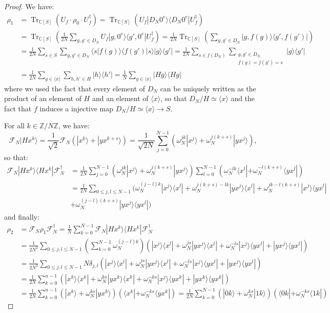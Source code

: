\documentclass[a4paper,10pt,notitlepage]{report}
\theoremstyle{definition}
\theoremstyle{plain}
\theoremstyle{definition}
\newcommand{\Z}{\mathbb{Z}}
\newcommand{\C}{\mathbb{C}}
\newcommand{\m}[1]{\mathcal{#1}}
\renewcommand{\(}{\left(}
\renewcommand{\)}{\right)}
\DeclareMathOperator{\Tr}{Tr}
\begin{document}
\begin{proof}
We have:
\begin{align*}
\rho_1&=\Tr_{\C[S]}(U_f\cdot \rho_0\cdot U_f^{\dag})=\Tr_{\C[S]}(U_f|D_N0^e\rangle\langle D_N 0^e|U_f^{\dag})\\
&=\Tr_{\C[S]}\(\frac{1}{2N}\sum_{g,g'\in D_N}U_f|g,0^e\rangle\langle g',0^e|U_f^{\dag}\)=\frac{1}{2N}\Tr_{\C[S]}\(\sum_{g,g'\in D_N}|g,f(g)\rangle\langle g',f(g')|\)\\
&=\frac{1}{2N}\sum_{s\in S}\sum_{g,g'\in D_N}\langle s|f(g)\rangle \langle f(g')|s\rangle |g\rangle\langle g'|=\frac{1}{2N}\sum_{s\in f(D_N)}\sum_{\substack{g,g'\in D_N\\f(g)=f(g')=s}}|g\rangle\langle g'|\\
&=\frac{1}{2N}\sum_{g\in \langle x\rangle}\sum_{h,h'\in H}|h\rangle\langle h'|=\frac{1}{N}\sum_{g\in \langle x\rangle}|Hg\rangle\langle Hg|
\end{align*}
where we used the fact that every element of $D_N$ can be uniquely written as the product of an element of $H$ and an element of $\langle x\rangle$, so that $D_N/H\simeq \langle x\rangle$ and the fact that $f$ induces a injective map $D_N/H\simeq \langle x\rangle\longrightarrow S$.

For all $k\in\Z/N\Z$, we have:
\[\m{F}_N|Hx^k\rangle=\frac{1}{\sqrt{2}}\m{F}_N(|x^k\rangle+|yx^{k+s}\rangle)=\frac{1}{\sqrt{2N}}\sum_{j=0}^{N-1}(\omega_N^{jk}|x^j\rangle+\omega_N^{j(k+s)}|yx^j\rangle),\]
so that:
\begin{align*}
\m{F}_N|Hx^k\rangle\langle Hx^k|\m{F}_N^{\dag}&=\frac{1}{2N}\sum_{j=0}^{N-1}(\omega_N^{jk}|x^j\rangle+\omega_N^{j(k+s)}|yx^j\rangle)\sum_{l=0}^{N-1}(\omega_N^{-lk}\langle x^l|+\omega_N^{-l(k+s)}\langle yx^l|)\\
&=\frac{1}{2N}\sum_{0\leq j,l\leq N-1}(\omega_N^{(j-l)k}|x^j\rangle\langle x^l|+\omega_N^{j(k+s)-lk}|yx^j\rangle\langle x^l|+\omega_N^{jk-l(k+s)}|x^j\rangle\langle yx^l|\\
&+\omega_N^{(j-l)(k+s)}|yx^j\rangle\langle yx^l|)
\end{align*}
and finally:
\begin{align*}
\rho_2&=\m{F}_N\rho_1\m{F}_N^{\dag}=\frac{1}{N}\sum_{k=0}^{N-1}\m{F}_N|Hx^k\rangle\langle Hx^k|\m{F}_N^{\dag}\\
&=\frac{1}{2N^2}\sum_{0\leq j,l\leq N-1}\(\sum_{k=0}^{N-1}\omega_N^{(j-l)k}\)\(|x^j\rangle\langle x^l|+\omega_N^{js}|yx^j\rangle\langle x^l|+\omega_N^{-ls}|x^j\rangle\langle yx^l|+|yx^j\rangle\langle yx^l|\)\\
&=\frac{1}{2N^2}\sum_{0\leq j,l\leq N-1}N\delta_{j,l}\(|x^j\rangle\langle x^l|+\omega_N^{js}|yx^j\rangle\langle x^l|+\omega_N^{-ls}|x^j\rangle\langle yx^l|+|yx^j\rangle\langle yx^l|\)\\
&=\frac{1}{2N}\sum_{k=0}^{n-1}\(|x^k\rangle\langle x^k|+\omega_N^{ks}|yx^k\rangle\langle x^k|+\omega_N^{-ks}|x^j\rangle\langle yx^k|+|yx^k\rangle\langle yx^k|\)\\
&=\frac{1}{2N}\sum_{k=0}^{n-1}(|x^k\rangle +\omega_N^{ks}|yx^k\rangle)(\langle x^k|+\omega_N^{-ks}\langle yx^k|)=\frac{1}{2N}\sum_{k=0}^{N-1}(|0k\rangle +\omega_N^{ks}|1k\rangle)(\langle 0k|+\omega_N^{-ks}\langle 1k|)
\end{align*}


\end{proof}
\end{document}
